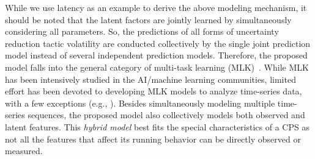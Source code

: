 \documentclass[12pt]{article}
\newcommand{\dan}[1]{\textcolor{blue}{{\it [Dan says: #1]}}}
\begin{document}
While we use latency as an example to derive the above modeling mechanism, it should be noted that the latent factors are jointly learned by simultaneously considering all parameters. So, the predictions of all forms of uncertainty reduction tactic volatility are conducted collectively by the single joint prediction model instead of several independent prediction models. Therefore, the proposed model falls into the general category of multi-task learning (MLK)~\cite{zhang2017survey}. While MLK has been intensively studied in the AI/machine learning communities, limited effort has been devoted to developing MLK models to analyze time-series data, with a few exceptions (e.g., \cite{wang2012high}). Besides simultaneously modeling multiple time-series sequences, the proposed model also collectively models both observed and latent features. This {\em hybrid model} best fits the special characteristics of a CPS as not all the features that affect its running behavior can be directly observed or measured. 






 
 
\end{document}
